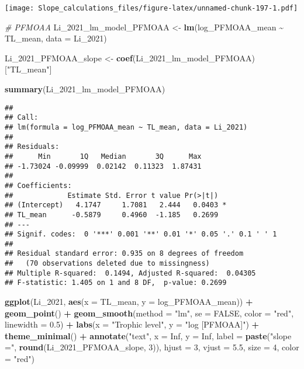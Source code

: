 \documentclass[
]{article}
\newenvironment{Shaded}{\begin{snugshade}}{\end{snugshade}}
\newcommand{\AttributeTok}[1]{\textcolor[rgb]{0.13,0.29,0.53}{#1}}
\newcommand{\CommentTok}[1]{\textcolor[rgb]{0.56,0.35,0.01}{\textit{#1}}}
\newcommand{\ConstantTok}[1]{\textcolor[rgb]{0.56,0.35,0.01}{#1}}
\newcommand{\DecValTok}[1]{\textcolor[rgb]{0.00,0.00,0.81}{#1}}
\newcommand{\FloatTok}[1]{\textcolor[rgb]{0.00,0.00,0.81}{#1}}
\newcommand{\FunctionTok}[1]{\textcolor[rgb]{0.13,0.29,0.53}{\textbf{#1}}}
\newcommand{\NormalTok}[1]{#1}
\newcommand{\OtherTok}[1]{\textcolor[rgb]{0.56,0.35,0.01}{#1}}
\newcommand{\SpecialCharTok}[1]{\textcolor[rgb]{0.81,0.36,0.00}{\textbf{#1}}}
\newcommand{\StringTok}[1]{\textcolor[rgb]{0.31,0.60,0.02}{#1}}
\begin{document}
\texttt{[image: Slope\_calculations\_files/figure-latex/unnamed-chunk-197-1.pdf]}

\begin{Shaded}
\begin{Highlighting}[]
\CommentTok{\# PFMOAA}
\NormalTok{Li\_2021\_lm\_model\_PFMOAA }\OtherTok{\textless{}{-}} \FunctionTok{lm}\NormalTok{(log\_PFMOAA\_mean }\SpecialCharTok{\textasciitilde{}}\NormalTok{ TL\_mean,}
                                    \AttributeTok{data =}\NormalTok{ Li\_2021)}

\NormalTok{Li\_2021\_PFMOAA\_slope }\OtherTok{\textless{}{-}} \FunctionTok{coef}\NormalTok{(Li\_2021\_lm\_model\_PFMOAA)[}\StringTok{"TL\_mean"}\NormalTok{]}

\FunctionTok{summary}\NormalTok{(Li\_2021\_lm\_model\_PFMOAA)}
\end{Highlighting}
\end{Shaded}

\begin{verbatim}
## 
## Call:
## lm(formula = log_PFMOAA_mean ~ TL_mean, data = Li_2021)
## 
## Residuals:
##      Min       1Q   Median       3Q      Max 
## -1.73024 -0.09999  0.02142  0.11323  1.87431 
## 
## Coefficients:
##             Estimate Std. Error t value Pr(>|t|)  
## (Intercept)   4.1747     1.7081   2.444   0.0403 *
## TL_mean      -0.5879     0.4960  -1.185   0.2699  
## ---
## Signif. codes:  0 '***' 0.001 '**' 0.01 '*' 0.05 '.' 0.1 ' ' 1
## 
## Residual standard error: 0.935 on 8 degrees of freedom
##   (70 observations deleted due to missingness)
## Multiple R-squared:  0.1494, Adjusted R-squared:  0.04305 
## F-statistic: 1.405 on 1 and 8 DF,  p-value: 0.2699
\end{verbatim}

\begin{Shaded}
\begin{Highlighting}[]
\FunctionTok{ggplot}\NormalTok{(Li\_2021, }\FunctionTok{aes}\NormalTok{(}\AttributeTok{x =}\NormalTok{ TL\_mean, }\AttributeTok{y =}\NormalTok{ log\_PFMOAA\_mean)) }\SpecialCharTok{+}
  \FunctionTok{geom\_point}\NormalTok{() }\SpecialCharTok{+}
  \FunctionTok{geom\_smooth}\NormalTok{(}\AttributeTok{method =} \StringTok{"lm"}\NormalTok{, }\AttributeTok{se =} \ConstantTok{FALSE}\NormalTok{, }\AttributeTok{color =} \StringTok{"red"}\NormalTok{, }\AttributeTok{linewidth =} \FloatTok{0.5}\NormalTok{) }\SpecialCharTok{+}
  \FunctionTok{labs}\NormalTok{(}\AttributeTok{x =} \StringTok{"Trophic level"}\NormalTok{,}
       \AttributeTok{y =} \StringTok{"log [PFMOAA]"}\NormalTok{) }\SpecialCharTok{+}
  \FunctionTok{theme\_minimal}\NormalTok{() }\SpecialCharTok{+}
  \FunctionTok{annotate}\NormalTok{(}\StringTok{"text"}\NormalTok{, }\AttributeTok{x =} \ConstantTok{Inf}\NormalTok{, }\AttributeTok{y =} \ConstantTok{Inf}\NormalTok{, }\AttributeTok{label =} \FunctionTok{paste}\NormalTok{(}\StringTok{"slope ="}\NormalTok{, }\FunctionTok{round}\NormalTok{(Li\_2021\_PFMOAA\_slope, }\DecValTok{3}\NormalTok{)), }
           \AttributeTok{hjust =} \DecValTok{3}\NormalTok{, }\AttributeTok{vjust =} \FloatTok{5.5}\NormalTok{, }\AttributeTok{size =} \DecValTok{4}\NormalTok{, }\AttributeTok{color =} \StringTok{"red"}\NormalTok{)}
\end{Highlighting}
\end{Shaded}
\end{document}
